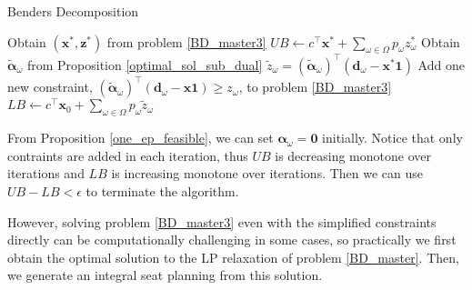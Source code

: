 


\begin{algorithm}[h]
  \caption{Benders Decomposition}\label{cut_algo}
    {Obtain $(\mathbf{x}^{*}, \mathbf{z}^{*})$ from problem \eqref{BD_master3}\;
    $UB \gets c^{\intercal} \mathbf{x}^{*} + \sum_{\omega \in \Omega} p_{\omega} z_{\omega}^{*}$\;
    {Obtain $\bm{\tilde{\alpha}}_{\omega}$ from Proposition \ref{optimal_sol_sub_dual}\; $\tilde{z}_{\omega}= (\bm{\tilde{\alpha}}_{\omega})^{\intercal}(\mathbf{d}_{\omega}- \mathbf{x}^{*} \mathbf{1})$\;
    {Add one new constraint, $(\bm{\tilde{\alpha}}_{\omega})^{\intercal}(\mathbf{d}_{\omega}- \mathbf{x} \mathbf{1}) \geq z_{\omega}$, to problem \eqref{BD_master3}\;}
    }
    {$LB \gets c^{\intercal} \mathbf{x}_{0} + \sum_{\omega \in \Omega} p_{\omega} \tilde{z}_{\omega} $\;}
    }
\end{algorithm}

From Proposition \ref{one_ep_feasible}, we can set $\bm{\alpha}_{\omega} = \mathbf{0}$ initially. Notice that only contraints are added in each iteration, thus $UB$ is decreasing monotone over iterations and $LB$ is increasing monotone over iterations. Then we can use $UB - LB < \epsilon$ to terminate the algorithm.


However, solving problem \eqref{BD_master3} even with the simplified constraints directly can be computationally challenging in some cases, so practically we first obtain the optimal solution to the LP relaxation of problem \eqref{BD_master}. Then, we generate an integral seat planning from this solution.

